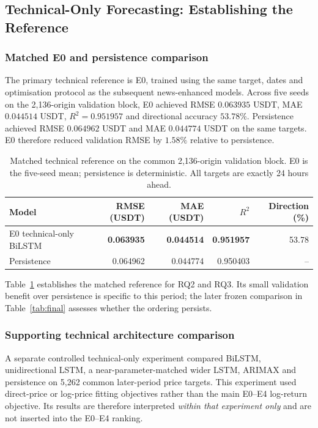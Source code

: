\subsection{Technical-Only Forecasting: Establishing the Reference}
\label{subsec:technical-only-results}

\subsubsection{Matched E0 and persistence comparison}

The primary technical reference is E0, trained using the same target, dates and optimisation protocol as the subsequent news-enhanced models. Across five seeds on the 2,136-origin validation block, E0 achieved RMSE $0.063935$ USDT, MAE $0.044514$ USDT, $R^2=0.951957$ and directional accuracy $53.78\%$. Persistence achieved RMSE $0.064962$ USDT and MAE $0.044774$ USDT on the same targets. E0 therefore reduced validation RMSE by $1.58\%$ relative to persistence.

\begin{table}[!htbp]
\centering\small
\caption{Matched technical reference on the common 2,136-origin validation block. E0 is the five-seed mean; persistence is deterministic. All targets are exactly 24 hours ahead.}
\label{tab:technical_matched_reference}
\begin{tabular}{lrrrr}
\toprule
Model & RMSE (USDT) & MAE (USDT) & $R^2$ & Direction (\%) \\
\midrule
E0 technical-only BiLSTM & \textbf{0.063935} & \textbf{0.044514} & \textbf{0.951957} & 53.78 \\
Persistence & 0.064962 & 0.044774 & 0.950403 & -- \\
\bottomrule
\end{tabular}
\end{table}

Table~\ref{tab:technical_matched_reference} establishes the matched reference for RQ2 and RQ3. Its small validation benefit over persistence is specific to this period; the later frozen comparison in Table~\ref{tab:final} assesses whether the ordering persists.

\subsubsection{Supporting technical architecture comparison}

A separate controlled technical-only experiment compared BiLSTM, unidirectional LSTM, a near-parameter-matched wider LSTM, ARIMAX and persistence on 5,262 common later-period price targets. This experiment used direct-price or log-price fitting objectives rather than the main E0--E4 log-return objective. Its results are therefore interpreted \emph{within that experiment only} and are not inserted into the E0--E4 ranking.

